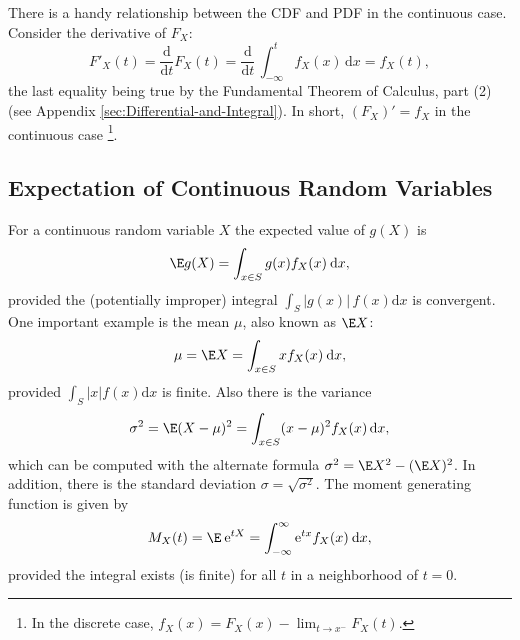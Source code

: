 \documentclass[captions=tableheading]{scrbook}
\begin{document}
There is a handy relationship between the CDF and PDF in the continuous case. Consider the derivative of \(F_{X}\):
\begin{equation}
F'_{X}(t)=\frac{\mathrm{d}}{\mathrm{d} t}F_{X}(t)=\frac{\mathrm{d}}{\mathrm{d} t}\,\int_{-\infty}^{t}f_{X}(x)\,\mathrm{d} x=f_{X}(t),
\end{equation}
the last equality being true by the Fundamental Theorem of Calculus, part (2) (see Appendix \ref{sec:Differential-and-Integral}). In short, \((F_{X})'=f_{X}\) in the continuous case
\footnote{In the discrete case, \(f_{X}(x)=F_{X}(x)-\lim_{t\to x^{-}}F_{X}(t)\).}. 
\subsection{Expectation of Continuous Random Variables}
\label{sec-6-1-2}

\label{sub:Expectation-of-Continuous}

For a continuous random variable \(X\) the expected value of \(g(X)\) is
\begin{equation}
\E g(X)=\int_{x\in S}g(x)f_{X}(x)\:\mathrm{d} x,
\end{equation}
provided the (potentially improper) integral \(\int_{S}|g(x)|\, f(x)\mathrm{d} x\) is convergent. One important example is the mean \(\mu\), also known as \(\E X\):
\begin{equation}
\mu=\E X=\int_{x\in S}xf_{X}(x)\:\mathrm{d} x,
\end{equation}
provided \(\int_{S}|x|f(x)\mathrm{d} x\) is finite. Also there is the variance
\begin{equation}
\sigma^{2}=\E(X-\mu)^{2}=\int_{x\in S}(x-\mu)^{2}f_{X}(x)\,\mathrm{d} x,
\end{equation}
which can be computed with the alternate formula \(\sigma^{2}=\E X^{2}-(\E X)^{2}\). In addition, there is the standard deviation \(\sigma=\sqrt{\sigma^{2}}\). The moment generating function is given by
\begin{equation}
M_{X}(t)=\E\:\mathrm{e}^{tX}=\int_{-\infty}^{\infty}\mathrm{e}^{tx}f_{X}(x)\:\mathrm{d} x,
\end{equation}
provided the integral exists (is finite) for all \(t\) in a neighborhood of \(t=0\).
\end{document}
